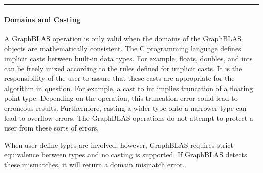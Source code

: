 \begin{table}[tb]
\begin{center}
\begin{tabular}{l|rcrcl}
\end{tabular}
\end{center}
\hrule
\end{table}

\paragraph{Domains and Casting}

A GraphBLAS operation is only valid when the domains of the GraphBLAS objects are
mathematically consistent.  The C programming language defines implicit casts 
between built-in data types.  For example, {\sf float}s, {\sf double}s, and {\sf int}s can be 
freely mixed according to the rules defined for implicit casts.  It is the 
responsibility of the user to assure that these casts are appropriate for the 
algorithm in question.  For example, a cast to {\sf int} implies truncation of a floating 
point type.  Depending on the operation, this truncation error could lead to
erroneous results.  Furthermore, casting a wider type onto a narrower type can lead 
to overflow errors.  The GraphBLAS operations do not attempt to protect a user from 
these sorts of errors.

When user-define types are involved, however, GraphBLAS requires strict equivalence
between types and no casting is supported.  If GraphBLAS detects these mismatches,
it will return a domain mismatch error.

